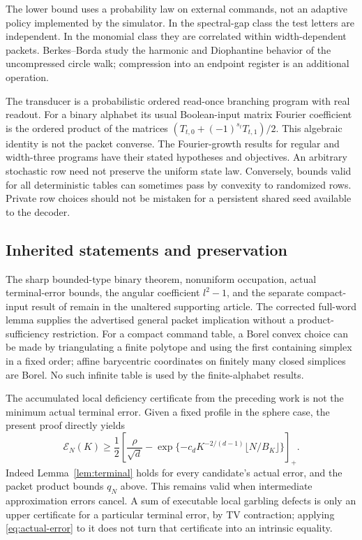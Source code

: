 The lower bound uses a probability law on external commands, not an
adaptive policy implemented by the simulator. In the spectral-gap class
the test letters are independent. In the monomial class they are
correlated within width-dependent packets. Berkes--Borda \cite{BB} study
the harmonic and Diophantine behavior of the uncompressed circle walk;
compression into an endpoint register is an additional operation.

The transducer is a probabilistic ordered read-once branching program
with real readout. For a binary alphabet its usual Boolean-input matrix
Fourier coefficient is the ordered product of the matrices
$(T_{t,0}+(-1)^{s_t}T_{t,1})/2$. This algebraic identity is not the packet
converse. The Fourier-growth results for regular and width-three programs
\cite{RSV,SVW,LPV} have their stated hypotheses and objectives. An arbitrary
stochastic row need not preserve the uniform state law. Conversely,
bounds valid for all deterministic tables can sometimes pass by convexity
to randomized rows. Private row choices should not be mistaken for a
persistent shared seed available to the decoder.

\subsection{Inherited statements and preservation}
The sharp bounded-type binary theorem, nonuniform occupation, actual
terminal-error bounds, the angular coefficient $l^2-1$, and the separate
compact-input result of \cite{GTF35} remain in the unaltered supporting
article. The corrected full-word lemma supplies the advertised general
packet implication without a product-sufficiency restriction. For a
compact command table, a Borel convex choice can be made by triangulating
a finite polytope and using the first containing simplex in a fixed order;
affine barycentric coordinates on finitely many closed simplices are
Borel. No such infinite table is used by the finite-alphabet results.

The accumulated local deficiency certificate from the preceding work
is not the minimum actual terminal error. Given a fixed profile in the
sphere case, the present proof directly yields
\begin{equation}\label{eq:actual-error}
 \mathcal E_N(K)\ge\frac12\left[
 \frac\rho{\sqrt d}-
 \exp\{-c_dK^{-2/(d-1)}\lfloor N/B_K\rfloor\}\right]_+.
\end{equation}
Indeed Lemma~\ref{lem:terminal} holds for every candidate's actual error,
and the packet product bounds $q_N$ above. This remains valid when
intermediate approximation errors cancel. A sum of executable local
garbling defects is only an upper certificate for a particular terminal
error, by TV contraction; applying \eqref{eq:actual-error} to it does not
turn that certificate into an intrinsic equality.

